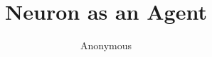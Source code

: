 \documentclass{article} %
\title{Neuron as an Agent}
\author{Anonymous}
\begin{document}
\maketitle

\begin{abstract}
\end{abstract}













\end{document}

